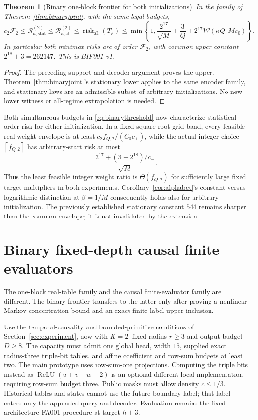 \documentclass[11pt,letterpaper]{article}
\newtheorem{theorem}{Theorem}[section]
\theoremstyle{definition}\newtheorem{definition}[theorem]{Definition}
\theoremstyle{remark}\newtheorem{remark}[theorem]{Remark}
\newcommand{\ceil}[1]{\left\lceil #1\right\rceil}
\newcommand{\Risk}{\mathcal{R}}
\newcommand{\unit}[1]{\textsf{#1}}
\begin{document}
\begin{theorem}[Binary one-block frontier for both initializations]\label{thm:binaryall}
In the family of Theorem~\ref{thm:binaryjoint}, with the same legal budgets,
\begin{equation}\label{eq:binaryall}
 c_2\mathcal F_2\le
 \Risk_{\kappa,\mathrm{stat}}^{(2)}
 \le\Risk_{\kappa,\mathrm{all}}^{(2)}
 \le\operatorname{risk}_{\mathrm{all}}(T_\kappa)
 \le\min\left\{1,\frac{2^{17}}{\sqrt M}+\frac3Q+
 2^{17}\mathcal W(\kappa Q,Me_0)\right\}.
\end{equation}
In particular both minimax risks are of order $\mathcal F_2$, with common upper constant $2^{18}+3=262147$. This is \unit{BIF001 v1}.
\end{theorem}
\begin{proof}
The preceding support and decoder argument proves the upper. Theorem~\ref{thm:binaryjoint}'s stationary lower applies to the same encoder family, and stationary laws are an admissible subset of arbitrary initializations. No new lower witness or all-regime extrapolation is needed.
\end{proof}

Both simultaneous budgets in \eqref{eq:binarythreshold} now characterize statistical-order risk for either initialization. In a fixed square-root grid band, every feasible real weight envelope is at least
$c_2f_{Q,2}/(C_0c_+)$, while the actual integer choice
$\ceil{f_{Q,2}}$ has arbitrary-start risk at most
\[
 \frac{2^{17}+(3+2^{18})/c_-}{\sqrt M}.
\]
Thus the least feasible integer weight ratio is $\Theta(f_{Q,2})$ for sufficiently large fixed target multipliers in both experiments. Corollary~\ref{cor:alphabet}'s constant-versus-logarithmic distinction at $\beta=1/M$ consequently holds also for arbitrary initialization. The previously established stationary constant $544$ remains sharper than the common envelope; it is not invalidated by the extension.

\section{Binary fixed-depth causal finite evaluators}\label{sec:binarycausal}
The one-block real-table family and the causal finite-evaluator family are different. The binary frontier transfers to the latter only after proving a nonlinear Markov concentration bound and an exact finite-label upper inclusion.

Use the temporal-causality and bounded-primitive conditions of Section~\ref{sec:experiment}, now with $K=2$, fixed radius $r\ge3$ and output budget $D\ge8$. The capacity must admit one global head, width $16$, supplied exact radius-three triple-bit tables, and affine coefficient and row-sum budgets at least two. The main prototype uses row-sum-one projections. Computing the triple bits instead as $\operatorname{ReLU}(u+v+w-2)$ is an optional different local implementation requiring row-sum budget three. Public masks must allow density $c\le1/3$. Historical tables and states cannot use the future boundary label; that label enters only the appended query and decoder. Evaluation remains the fixed-architecture FA001 procedure at target $h+3$.
\end{document}

